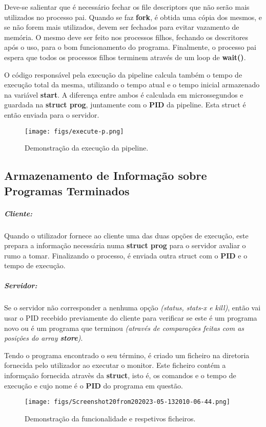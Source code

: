 \documentclass{report}
\begin{document}
Deve-se salientar que é necessário fechar os file descriptors que não serão mais utilizados no processo pai. Quando se faz \textbf{fork}, é obtida uma cópia dos mesmos, e se não forem mais utilizados, devem ser fechados para evitar vazamento de memória. O mesmo deve ser feito nos processos filhos, fechando os descritores após o uso, para o bom funcionamento do programa.
Finalmente, o processo pai espera que todos os processos filhos terminem através de um loop de \textbf{wait()}.\par
O código responsável pela execução da pipeline calcula também o tempo de execução total da mesma, utilizando o tempo atual e o tempo inicial armazenado na variável \textbf{start}. A diferença entre ambos é calculada em microssegundos e guardada na \textbf{struct prog}, juntamente com o \textbf{PID} da pipeline. Esta struct é então enviada para o servidor.

\begin{figure}[h]
    \centering
    \texttt{[image: figs/execute-p.png]}
    \caption{Demonstração da execução da pipeline.}
    \label{f}
\end{figure}


\subsection{Armazenamento de Informação sobre Programas Terminados}

\subparagraph{Cliente:} Quando o utilizador fornece ao cliente uma das duas opções de execução, este prepara a informação necessária numa \textbf{struct prog} para o servidor avaliar o rumo a tomar. Finalizando o processo, é enviada outra struct com o \textbf{PID} e o tempo de execução.

\subparagraph{Servidor:} Se o servidor não corresponder a nenhuma opção \textit{(status, stats-x e kill)}, então vai usar o PID recebido previamente do cliente para verificar se este é um programa novo ou é um programa que terminou \textit{(através de comparações feitas com as posições do array \textbf{store})}.\par
Tendo o programa encontrado o seu término, é criado um ficheiro na diretoria fornecida pelo utilizador ao executar o monitor. Este ficheiro contém a informçaão fornecida atravès da \textbf{struct}, isto é, os comandos e o tempo de execução e cujo nome é o \textbf{PID} do programa em questão.

\begin{figure}[h]
    \centering
    \texttt{[image: figs/Screenshot20from202023-05-132010-06-44.png]}
    \caption{Demonstração da funcionalidade e respetivos ficheiros.}
    \label{f}
\end{figure}
\end{document}
